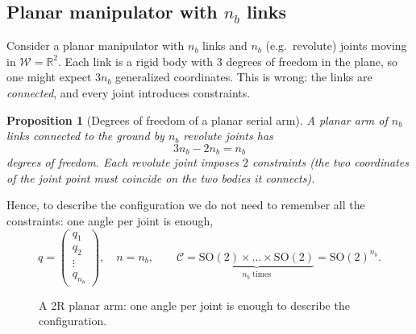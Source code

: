 \documentclass[11pt,a4paper]{article}
\def\boldsymbol#1{#1}%
\newcommand{\R}{\mathbb{R}}
\newcommand{\W}{\mathcal{W}}
\newcommand{\C}{\mathcal{C}}
\newcommand{\SO}{\mathrm{SO}}
\newcommand{\q}{\boldsymbol{q}}
\theoremstyle{definition}
\theoremstyle{plain}
\newtheorem{proposition}[definition]{Proposition}
\theoremstyle{remark}
\begin{document}
\subsection{Planar manipulator with $n_b$ links}

Consider a planar manipulator with $n_b$ links and $n_b$ (e.g.\ revolute) joints moving in $\W=\R^2$. Each link is a rigid body with 3 degrees of freedom in the plane, so one might expect $3n_b$ generalized coordinates. This is wrong: the links are \emph{connected}, and every joint introduces constraints.

\begin{proposition}[Degrees of freedom of a planar serial arm]
A planar arm of $n_b$ links connected to the ground by $n_b$ revolute joints has
\[
  3n_b-2n_b=n_b
\]
degrees of freedom. Each revolute joint imposes $2$ constraints (the two coordinates of the joint point must coincide on the two bodies it connects).
\end{proposition}

Hence, to describe the configuration we do not need to remember all the constraints: one angle per joint is enough,
\[
  q=\begin{pmatrix}q_1\\q_2\\\vdots\\q_{n_b}\end{pmatrix},\quad n=n_b,\qquad
  \C=\underbrace{\SO(2)\times\dots\times\SO(2)}_{n_b\text{ times}}=\SO(2)^{n_b}.
\]

\begin{figure}[ht]
\centering
{}
\caption{A 2R planar arm: one angle per joint is enough to describe the configuration.}
\end{figure}
\end{document}
